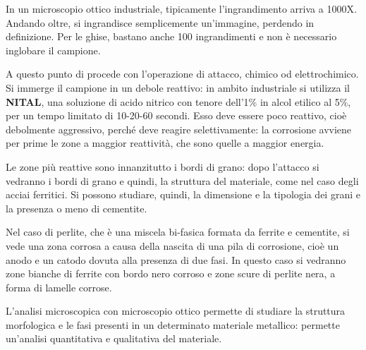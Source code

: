 In un microscopio ottico industriale, tipicamente l’ingrandimento arriva a 1000X. Andando oltre, si ingrandisce semplicemente un’immagine, perdendo in definizione.
Per le ghise, bastano anche 100 ingrandimenti e non è necessario inglobare il campione.

A questo punto di procede con l’operazione di attacco, chimico od elettrochimico.\\
Si immerge il campione in un debole reattivo: in ambito industriale si utilizza il \textbf{NITAL}, una soluzione di acido nitrico con tenore dell’1\% in alcol etilico al 5\%, per un tempo limitato di 10-20-60 secondi. Esso deve essere poco reattivo, cioè debolmente aggressivo, perché deve reagire selettivamente: la corrosione avviene per prime le zone a maggior reattività, che sono quelle a maggior energia.

Le zone più reattive sono innanzitutto i bordi di grano: dopo l’attacco si vedranno i bordi di grano e quindi, la struttura del materiale, come nel caso degli acciai ferritici. Si possono studiare, quindi, la dimensione e la tipologia dei grani e la presenza o meno di cementite.

Nel caso di perlite, che è una miscela bi-fasica formata da ferrite e cementite, si vede una zona corrosa a causa della nascita di una pila di corrosione, cioè un anodo e un catodo dovuta alla presenza di due fasi. In questo caso si vedranno zone bianche di ferrite con bordo nero corroso e zone scure di perlite nera, a forma di lamelle corrose.

L’analisi microscopica con microscopio ottico permette di studiare la struttura morfologica e le fasi presenti in un determinato materiale metallico: permette un’analisi quantitativa e qualitativa del materiale.

